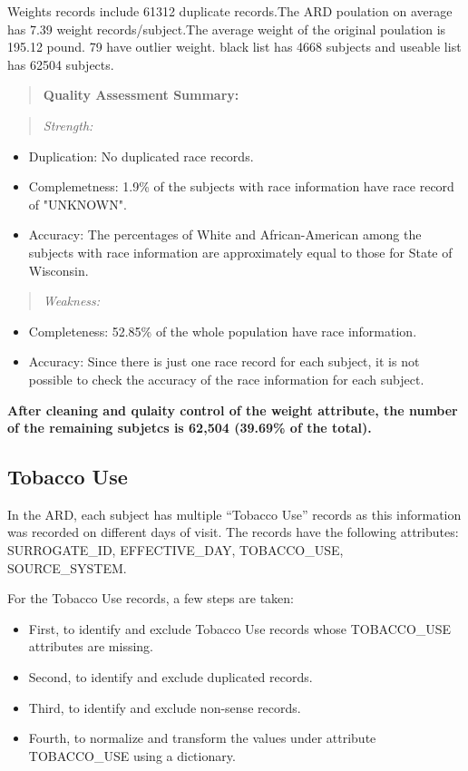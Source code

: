 \documentclass{article}
\begin{document}
Weights records include 61312 duplicate records.The ARD poulation on average has 7.39 weight records/subject.The average weight of the original poulation is 195.12 pound.  79 have outlier weight. 
black list has 4668 subjects and useable list has 62504 subjects.

\begin{quote}
\textbf{Quality Assessment Summary:}
\end{quote}
\begin{quote}
\emph{Strength:}
\end{quote}
\begin{itemize}
  \item Duplication: No duplicated race records.
  \item Complemetness: 1.9\% of the subjects with race information have race record of "UNKNOWN".
  \item Accuracy: The percentages of White and African-American among the subjects with race information are approximately equal to those for State of Wisconsin.
\end{itemize}
\begin{quote}
\emph{Weakness:}
\end{quote}
\begin{itemize}
  \item Completeness: 52.85\% of the whole population have race information.
  \item Accuracy: Since there is just one race record for each subject, it is not possible to check the accuracy of the race information for each subject.
\end{itemize}


\textbf{After cleaning and qulaity control of the weight attribute, the number of the remaining subjetcs is 62,504 (39.69\% of the total).}


\subsection{Tobacco Use}
In the ARD, each subject has multiple ``Tobacco Use'' records as this information was recorded on different days of visit. The records have the following attributes:
SURROGATE\_ID, EFFECTIVE\_DAY, TOBACCO\_USE, SOURCE\_SYSTEM.

For the Tobacco Use records, a few steps are taken:
\begin{itemize}
  \item First, to identify and exclude Tobacco Use records whose TOBACCO\_USE attributes are missing.
  \item Second, to identify and exclude duplicated records.
  \item Third, to identify and exclude non-sense records.
  \item Fourth, to normalize and transform the values under attribute TOBACCO\_USE using a dictionary.
  \end{itemize}
  
\end{document}
